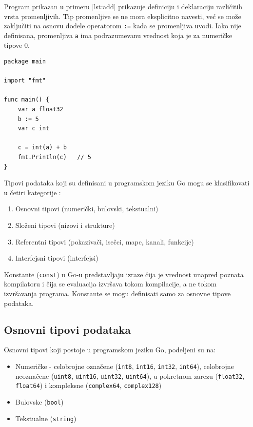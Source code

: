 \documentclass[12pt,oneside]{memoir}
\begin{document}
Program prikazan u primeru \ref{lst:add} prikazuje definiciju i deklaraciju različitih vrsta promenljivih. Tip promenljive se ne mora eksplicitno navesti, već se može zaključiti na osnovu dodele operatorom \texttt{:=} kada se promenljiva uvodi. Iako nije definisana, promenljiva \texttt{a} ima podrazumevanu vrednost koja je za numeričke tipove 0.

\begin{center}
\begin{lstlisting}[caption=Program koji ilustruje rad sa promenljivama, label={lst:add},  backgroundcolor=\color{background}]
package main

import "fmt"

func main() {
	var a float32
	b := 5
	var c int

	c = int(a) + b
	fmt.Println(c)	 // 5
}
\end{lstlisting}
\end{center}

\newpage

Tipovi podataka koji su definisani u programskom jeziku Go mogu se klasifikovati u četiri kategorije \cite{bookGoProg}: 
\begin{enumerate}
\item Osnovni tipovi  (numerički, bulovski, tekstualni)
\item Složeni tipovi (nizovi i strukture)
\item Referentni tipovi (pokazivači, isečci, mape, kanali, funkcije)
\item Interfejsni tipovi (interfejsi)
\end{enumerate}

Konstante (\texttt{const}) u Go-u predstavljaju izraze čija je vrednost unapred poznata kompilatoru i čija se evaluacija izvršava tokom kompilacije, a ne tokom izvršavanja programa. Konstante se mogu definisati samo za osnovne tipove podataka. 

\subsection{Osnovni tipovi podataka}

Osnovni tipovi koji postoje u programskom jeziku Go, podeljeni su na:
\begin{itemize}

\item Numeričke -  celobrojne označene (\texttt{int8}, \texttt{int16}, \texttt{int32}, \texttt{int64}),
 celobrojne neoznačene  (\texttt{uint8}, \texttt{uint16}, \texttt{uint32}, \texttt{uint64}), u pokretnom zarezu (\texttt{float32}, \texttt{float64}) i kompleksne (\texttt{complex64}, \texttt{complex128})

\item Bulovske  (\texttt{bool})

\item Tekstualne (\texttt{string})

\end{itemize}
\end{document}
